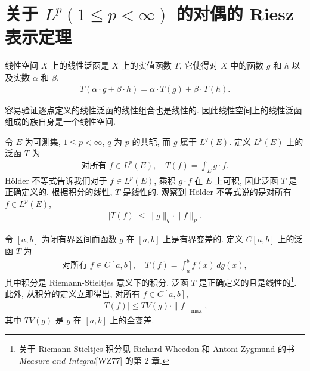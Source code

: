 \documentclass[../../main.tex]{subfiles}
\begin{document}
\section{关于 $L^{p}(1\leqslant p<\infty)$ 的对偶的 Riesz 表示定理}\label{section:ch08-Riesz表示}

\begin{definition}[线性泛函]\label{definition:ch08-线性泛函}
线性空间 $X$ 上的线性泛函是 $X$ 上的实值函数 $T$, 它使得对 $X$ 中的函数 $g$ 和 $h$ 以及实数 $\alpha$ 和 $\beta$,
\begin{align*}
T(\alpha\cdot g+\beta\cdot h)=\alpha\cdot T(g)+\beta\cdot T(h).
\end{align*}
\end{definition}

容易验证逐点定义的线性泛函的线性组合也是线性的. 因此线性空间上的线性泛函组成的族自身是一个线性空间.

\begin{example}\label{example:ch08-积分泛函}
令 $E$ 为可测集, $1\leqslant p<\infty$, $q$ 为 $p$ 的共轭, 而 $g$ 属于 $L^{q}(E)$. 定义 $L^{p}(E)$ 上的泛函 $T$ 为
\begin{align}
\text{对所有 }f\in L^{p}(E),\quad T(f)=\int_{E}g\cdot f.\label{align:ch08-积分泛函}
\end{align}
H\"older 不等式告诉我们对于 $f\in L^{p}(E)$, 乘积 $g\cdot f$ 在 $E$ 上可积, 因此泛函 $T$ 是正确定义的. 根据积分的线性, $T$ 是线性的. 观察到 H\"older 不等式说的是对所有 $f\in L^{p}(E)$,
\begin{align}
|T(f)|\leqslant\|g\|_{q}\cdot\|f\|_{p}.\label{align:ch08-积分泛函估计}
\end{align}
\end{example}

\begin{example}\label{example:ch08-Riemann-Stieltjes}
令 $[a,b]$ 为闭有界区间而函数 $g$ 在 $[a,b]$ 上是有界变差的. 定义 $C[a,b]$ 上的泛函 $T$ 为
\begin{align}
\text{对所有 }f\in C[a,b],\quad T(f)=\int_{a}^{b}f(x)\,dg(x),\label{align:ch08-Stieltjes}
\end{align}
其中积分是 Riemann-Stieltjes 意义下的积分. 泛函 $T$ 是正确定义的且是线性的\footnote{关于 Riemann-Stieltjes 积分见 Richard Wheedon 和 Antoni Zygmund 的书 \emph{Measure and Integral}[WZ77] 的第 2 章.}. 此外, 从积分的定义立即得出, 对所有 $f\in C[a,b]$,
\begin{align}
|T(f)|\leqslant TV(g)\cdot\|f\|_{\max},\label{align:ch08-Stieltjes估计}
\end{align}
其中 $TV(g)$ 是 $g$ 在 $[a,b]$ 上的全变差.
\end{example}
\end{document}
